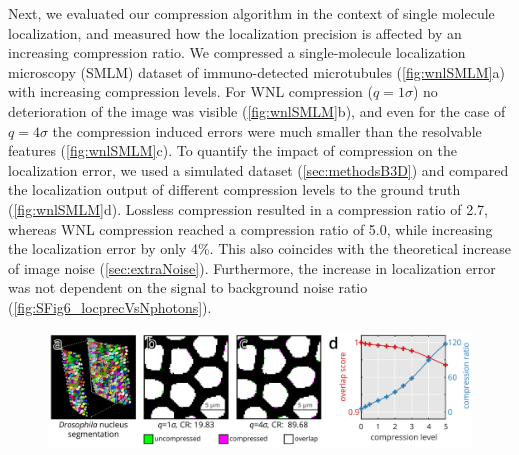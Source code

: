     Next, we evaluated our compression algorithm in the context of single molecule localization, and measured how the localization precision is affected by an increasing compression ratio. We compressed a single-molecule localization microscopy (SMLM) dataset of immuno-detected microtubules (\autoref{fig:wnlSMLM}a) with increasing compression levels. For WNL compression ($q=1\sigma$) no deterioration of the image was visible (\autoref{fig:wnlSMLM}b), and even for the case of $q=4\sigma$ the compression induced errors were much smaller than the resolvable features (\autoref{fig:wnlSMLM}c). To quantify the impact of compression on the localization error, we used a simulated dataset (\autoref{sec:methodsB3D}) and compared the localization output of different compression levels to the ground truth (\autoref{fig:wnlSMLM}d). Lossless compression resulted in a compression ratio of 2.7, whereas WNL compression reached a compression ratio of 5.0, while increasing the localization error by only 4\%. This also coincides with the theoretical increase of image noise (\autoref{sec:extraNoise}). Furthermore, the increase in localization error was not dependent on the signal to background noise ratio (\autoref{fig:SFig6_locprecVsNphotons}).

    \begin{figure}[tpb]
      \centering
      \includegraphics[page=2,width=1\textwidth]{LLvsB3D}
      \label{fig:wnlSMLM}
    \end{figure}

